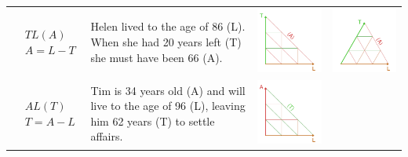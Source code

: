 \documentclass[12pt,oneside,a4paper]{article} %
\begin{document}
\begin{longtable}{m{}m{}m{}m{}}
  $$\begin{aligned}
    &TL(A) \\
    &A = L - T
  \end{aligned}$$ &
  Helen lived to the age of 86 (L). When she had 20 years left (T) she must have been 66 (A). &
  \includegraphics[scale=.5]{Figures/DiagramTable/TL_rt.pdf} &
  \includegraphics[scale=.5]{Figures/DiagramTable/TL_iso.pdf}  \\
  $$\begin{aligned}
    &AL(T) \\
    &T = A - L
  \end{aligned}$$ &
  Tim is 34 years old (A) and will live to the age of 96 (L), leaving him 62 years (T) to settle affairs. &
  \includegraphics[scale=.5]{Figures/DiagramTable/AL_rt.pdf} &

\end{longtable}
\end{document}
